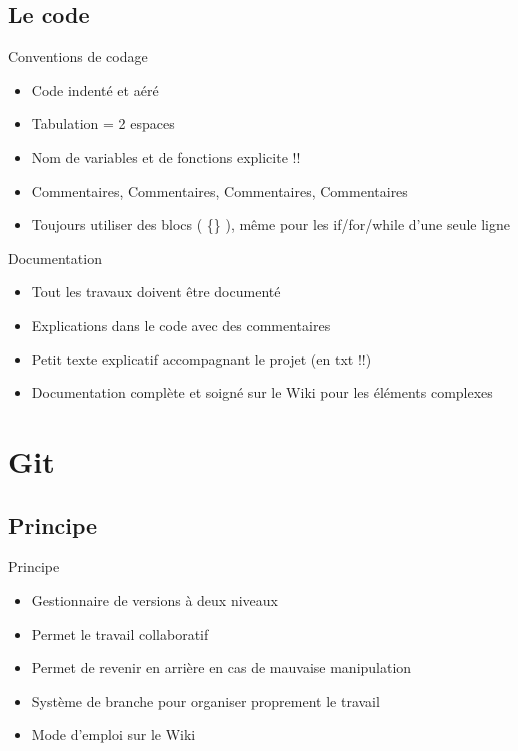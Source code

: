 \documentclass{beamer}
\begin{document}
\subsection{Le code}
\begin{frame}{Conventions de codage}
	\begin{itemize}
		\item Code indenté et aéré
		\item Tabulation = 2 espaces
		\item Nom de variables et de fonctions explicite !!
		\item Commentaires, Commentaires, Commentaires, Commentaires
		\item Toujours utiliser des blocs ( \{\} ), même pour les if/for/while d'une seule ligne
	\end{itemize}
\end{frame}

\begin{frame}{Documentation}
	\begin{itemize}
		\item Tout les travaux doivent être documenté
		\item Explications dans le code avec des commentaires
		\item Petit texte explicatif accompagnant le projet (en txt !!)
		\item Documentation complète et soigné sur le Wiki pour les éléments complexes
	\end{itemize}
\end{frame}

\section{Git}
\subsection{Principe}
\begin{frame}{Principe}
	\begin{itemize}
		\item Gestionnaire de versions à deux niveaux
		\item Permet le travail collaboratif
		\item Permet de revenir en arrière en cas de mauvaise manipulation
		\item Système de branche pour organiser proprement le travail
		\item Mode d'emploi sur le Wiki
	\end{itemize}
\end{frame}
\end{document}
